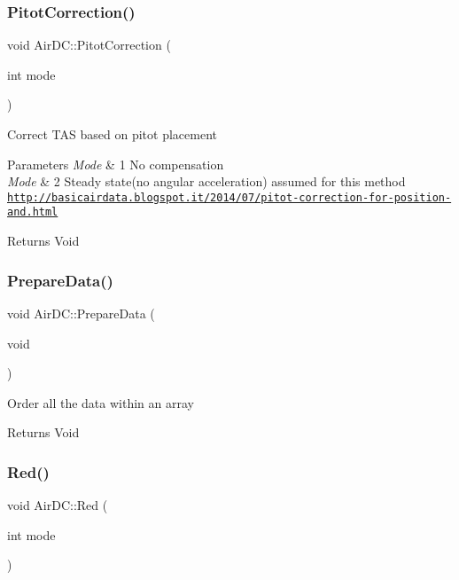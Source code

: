 \subsubsection{\texorpdfstring{Pitot\+Correction()}{PitotCorrection()}}
{\footnotesize\ttfamily void Air\+D\+C\+::\+Pitot\+Correction (\begin{DoxyParamCaption}\item[{int}]{mode }\end{DoxyParamCaption})}

Correct T\+AS based on pitot placement 
\begin{DoxyParams}{Parameters}
{\em Mode} & 1 No compensation \\
\hline
{\em Mode} & 2 Steady state(no angular acceleration) assumed for this method ~\newline
 \href{http://basicairdata.blogspot.it/2014/07/pitot-correction-for-position-and.html}{\tt http\+://basicairdata.\+blogspot.\+it/2014/07/pitot-\/correction-\/for-\/position-\/and.\+html} \\
\hline
\end{DoxyParams}
\begin{DoxyReturn}{Returns}
Void 
\end{DoxyReturn}
\mbox{\label{class_air_d_c_a01cfc37b82ec5e4b1e568e4119a6b652}} 
\subsubsection{\texorpdfstring{Prepare\+Data()}{PrepareData()}}
{\footnotesize\ttfamily void Air\+D\+C\+::\+Prepare\+Data (\begin{DoxyParamCaption}\item[{void}]{ }\end{DoxyParamCaption})}

Order all the data within an array \begin{DoxyReturn}{Returns}
Void 
\end{DoxyReturn}
\mbox{\label{class_air_d_c_a4be77c1575a1ec53e6c2a7199942d3e2}} 
\subsubsection{\texorpdfstring{Red()}{Red()}}
{\footnotesize\ttfamily void Air\+D\+C\+::\+Red (\begin{DoxyParamCaption}\item[{int}]{mode }\end{DoxyParamCaption})}

